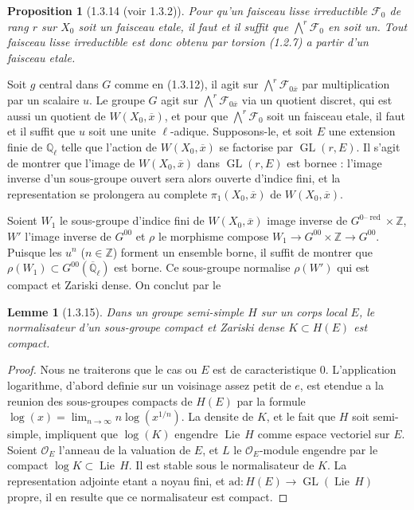 \documentclass[12pt,a4paper]{article}
\theoremstyle{plain}
\newtheorem{lemme}[theorem]{Lemme}
\newtheorem{proposition}[theorem]{Proposition}
\theoremstyle{definition}
\theoremstyle{definition}
\theoremstyle{remark}
\DeclareMathOperator{\GL}{GL}
\DeclareMathOperator{\Lie}{Lie}
\DeclareMathOperator{\red}{red}
\begin{document}
\begin{proposition}[1.3.14 (voir 1.3.2)]
Pour qu'un faisceau lisse irreductible $\mathscr{F}_0$ de rang $r$ sur $X_0$ soit un faisceau etale, il faut et il suffit que $\bigwedge^r \mathscr{F}_0$ en soit un. Tout faisceau lisse irreductible est donc obtenu par torsion (1.2.7) a partir d'un faisceau etale.
\end{proposition}

Soit $g$ central dans $G$ comme en (1.3.12), il agit sur $\bigwedge^r \mathscr{F}_{0\overline{x}}$ par multiplication par un scalaire $u$. Le groupe $G$ agit sur $\bigwedge^r \mathscr{F}_{0\overline{x}}$ via un quotient discret, qui est aussi un quotient de $W(X_0, \overline{x})$, et pour que $\bigwedge^r \mathscr{F}_0$ soit un faisceau etale, il faut et il suffit que $u$ soit une unite $\ell$-adique. Supposons-le, et soit $E$ une extension finie de $\mathbb{Q}_\ell$ telle que l'action de $W(X_0, \overline{x})$ se factorise par $\GL(r, E)$. Il s'agit de montrer que l'image de $W(X_0, \overline{x})$ dans $\GL(r, E)$ est bornee : l'image inverse d'un sous-groupe ouvert sera alors ouverte d'indice fini, et la representation se prolongera au complete $\pi_1(X_0, \overline{x})$ de $W(X_0, \overline{x})$.

Soient $W_1$ le sous-groupe d'indice fini de $W(X_0, \overline{x})$ image inverse de $G^{0\text{--}\red} \times \mathbb{Z}$, $W'$ l'image inverse de $G^{00}$ et $\rho$ le morphisme compose $W_1 \to G^{00} \times \mathbb{Z} \to G^{00}$. Puisque les $u^n$ ($n \in \mathbb{Z}$) forment un ensemble borne, il suffit de montrer que $\rho(W_1) \subset G^{00}(\overline{\mathbb{Q}}_\ell)$ est borne. Ce sous-groupe normalise $\rho(W')$ qui est compact et Zariski dense. On conclut par le

\begin{lemme}[1.3.15]
Dans un groupe semi-simple $H$ sur un corps local $E$, le normalisateur d'un sous-groupe compact et Zariski dense $K \subset H(E)$ est compact.
\end{lemme}

\begin{proof}
Nous ne traiterons que le cas ou $E$ est de caracteristique $0$. L'application logarithme, d'abord definie sur un voisinage assez petit de $e$, est etendue a la reunion des sous-groupes compacts de $H(E)$ par la formule $\log(x) = \lim_{n \to \infty} n \log(x^{1/n})$. La densite de $K$, et le fait que $H$ soit semi-simple, impliquent que $\log(K)$ engendre $\Lie\, H$ comme espace vectoriel sur $E$. Soient $\mathcal{O}_E$ l'anneau de la valuation de $E$, et $L$ le $\mathcal{O}_E$-module engendre par le compact $\log K \subset \Lie\, H$. Il est stable sous le normalisateur de $K$. La representation adjointe etant a noyau fini, et $\text{ad}: H(E) \to \GL(\Lie\, H)$ propre, il en resulte que ce normalisateur est compact.
\end{proof}
\end{document}
